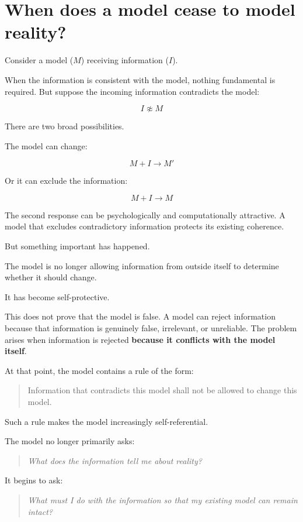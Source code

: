 \documentclass{article}
\begin{document}
\section*{When does a model cease to model reality?}

Consider a model (\(M\)) receiving information (\(I\)).

When the information is consistent with the model, nothing fundamental is required. But suppose the incoming information contradicts the model:

\[
I \not\approx M
\]

There are two broad possibilities.

The model can change:

\[
M + I \rightarrow M'
\]

Or it can exclude the information:

\[
M + I \rightarrow M
\]

The second response can be psychologically and computationally attractive. A model that excludes contradictory information protects its existing coherence.

But something important has happened.

The model is no longer allowing information from outside itself to determine whether it should change.

It has become self-protective.

This does not prove that the model is false. A model can reject information because that information is genuinely false, irrelevant, or unreliable. The problem arises when information is rejected \textbf{because it conflicts with the model itself}.

At that point, the model contains a rule of the form:

\begin{quote}
    Information that contradicts this model shall not be allowed to change this model.
\end{quote}

Such a rule makes the model increasingly self-referential.

The model no longer primarily asks:

\begin{quote}
    \textit{What does the information tell me about reality?}
\end{quote}

It begins to ask:

\begin{quote}
    \textit{What must I do with the information so that my existing model can remain intact?}
\end{quote}
\end{document}
